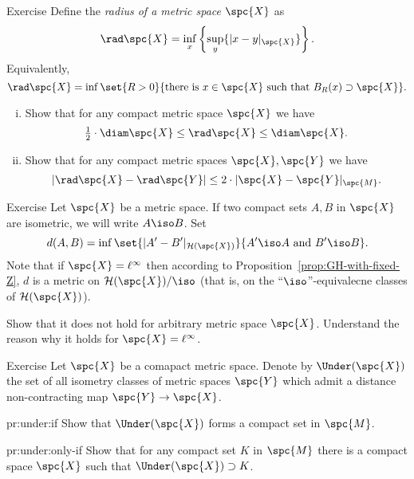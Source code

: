 \begin{thm}{Exercise}\label{pr:GH3}
Define the \emph{radius of a metric space} $\spc{X}$ as 
$$\rad \spc{X}=\inf_x\left\{\sup_y\{|x-y|_{\spc{X}}\}\right\}.$$
Equivalently, 
$$\rad \spc{X}=\inf\set{R>0}{\text{there is}\ x\in \spc{X}\  \text{such that}\ B_R(x)\supset \spc{X}}.$$
 
\begin{enumerate}[(i)]
\item Show that for any compact metric space $\spc{X}$ we have
$$\tfrac12\cdot\diam \spc{X}\le \rad \spc{X}\le \diam \spc{X}.$$
\item Show that for any compact metric spaces $\spc{X},\spc{Y}$ we have
$$|\rad \spc{X}-\rad \spc{Y}|\le 2\cdot |\spc{X}-\spc{Y}|_{\spc{M}}.$$
\end{enumerate}
\end{thm}

\begin{thm}{Exercise}\label{pr:F-X}
Let $\spc{X}$ be a metric space.
If two compact sets $A, B$ in $\spc{X}$ are isometric,
we will write $A\iso B$. 
Set
$$d(A,B)=\inf \set{|A'-B'|_{\mathcal{H}(\spc{X})}}{A'\iso A \ \text{and}\ B'\iso B}.$$
Note that if $\spc{X}=\ell^\infty$ then according to Proposition~\ref{prop:GH-with-fixed-Z}, 
$d$ is a metric on $\mathcal{H}(\spc{X})/\iso$ (that is, on the ``$\iso$''-equivalecne classes of $\mathcal{H}(\spc{X})$).

Show that it does not hold for arbitrary metric space $\spc{X}$.
Understand the reason why it holds for $\spc{X}=\ell^\infty$.
\end{thm}

\begin{thm}{Exercise}\label{pr:under}
Let $\spc{X}$ be a comapact metric space.
Denote by $\Under(\spc{X})$ the set of all isometry classes of metric spaces $\spc{Y}$ 
which admit a distance non-contracting map $\spc{Y}\to \spc{X}$.

\begin{subthm}{pr:under:if}
Show that $\Under(\spc{X})$ forms a compact set in $\spc{M}$.
\end{subthm}

\begin{subthm}{pr:under:only-if}
Show that for any compact set $K$ in $\spc{M}$ there is a compact space $\spc{X}$
such that  $\Under(\spc{X})\supset K$.
\end{subthm}

\end{thm}


